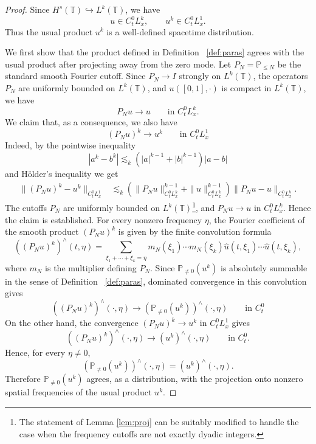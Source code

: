 \documentclass[12pt,reqno,letterpaper]{amsart}
\numberwithin{equation}{section}
\newcommand{\1}{{\bf 1}}
\newcommand{\2}{{\bf 2}}
\newcommand{\T}{\mathbb T}
\theoremstyle{remark}
\theoremstyle{remark}
\begin{document}
\begin{proof}
    Since $H^s(\T) \hookrightarrow L^k(\T)$, we have
    \[
    u\in C_t^0L_x^k, \qquad u^k \in C_t^0L_x^1.
    \]
    Thus the usual product $u^k$ is a well-defined spacetime distribution.

    We first show that the product defined in Definition ~\ref{def:paras} agrees with the usual product after projecting away from the zero mode. Let $P_N =\mathbb P_{\le N}$ be the standard smooth Fourier cutoff. Since $P_N \to I$ strongly on $L^k(\T)$, the operators $P_N$ are uniformly bounded on $L^k(\T)$, and $u([0,1],\cdot)$ is compact in $L^k(\T)$, we have
    \[
    P_N u\to u \qquad \text{in } C_t^0L_x^k.
    \]
    We claim that, as a consequence, we also have
    \[
    (P_Nu)^k \to u^k \qquad \text{in }C_t^0L_x^1
    \]
    Indeed, by the pointwise inequality
    \[
    |a^k - b^k| \lesssim_k (|a|^{k-1} +|b|^{k-1})|a-b|
    \]
    and H\"older's inequality we get
    \[
    \begin{aligned}
        \|(P_Nu)^k-u^k\|_{C_t^0L_x^1} &\lesssim_k \left(\|P_Nu\|_{C_t^0L_x^k}^{k-1} + \|u\|_{C_t^0L_x^k}^{k-1} \right) \|P_Nu-u\|_{C_t^0L_x^k}.
    \end{aligned}
    \]
    The cutoffs $P_N$ are uniformly bounded on $L^k(\T)$\footnote{The statement of Lemma \ref{lem:proj} can be suitably modified to handle the case when the frequency cutoffs are not exactly dyadic integers.}, and $P_Nu\to u$ in $C_t^0L_x^k$. Hence
    the claim is established. For every nonzero frequency $\eta$, the Fourier coefficient of the smooth product $(P_Nu)^k$ is given by the finite convolution formula
    \[
    \left((P_Nu)^k\right)^{\wedge}(t,\eta) = \sum_{\xi_1+\cdots+\xi_k=\eta}m_N(\xi_1)\cdots m_N(\xi_k) \hat u(t,\xi_1)\cdots \hat u(t,\xi_k),
    \]
    where $m_N$ is the multiplier defining $P_N$. Since $\mathbb P_{\neq0}(u^k)$ is absolutely summable in the sense of Definition ~\ref{def:paras}, dominated convergence in this convolution gives
    \[
    \left((P_Nu)^k\right)^{\wedge}(\cdot,\eta) \to \left(\mathbb P_{\neq0}(u^k)\right)^{\wedge}(\cdot,\eta) \qquad \text{in }C_t^0
    \]
    On the other hand, the convergence $(P_Nu)^k \to u^k$ in $C_t^0L_x^1$ gives
    \[
    \left((P_Nu)^k\right)^{\wedge}(\cdot,\eta) \to \left(u^k\right)^{\wedge}(\cdot,\eta) \qquad \text{in } C_t^0.
    \]
    Hence, for every $\eta \neq 0$,
    \[
    \left(\mathbb P_{\neq 0}(u^k)\right)^{\wedge}(\cdot,\eta) = \left(u^k\right)^{\wedge}(\cdot,\eta).
    \]
    Therefore $\mathbb P_{\neq0}(u^k)$ agrees, as a distribution, with the projection onto nonzero spatial frequencies of the usual product $u^k$.


\end{proof}
\end{document}
